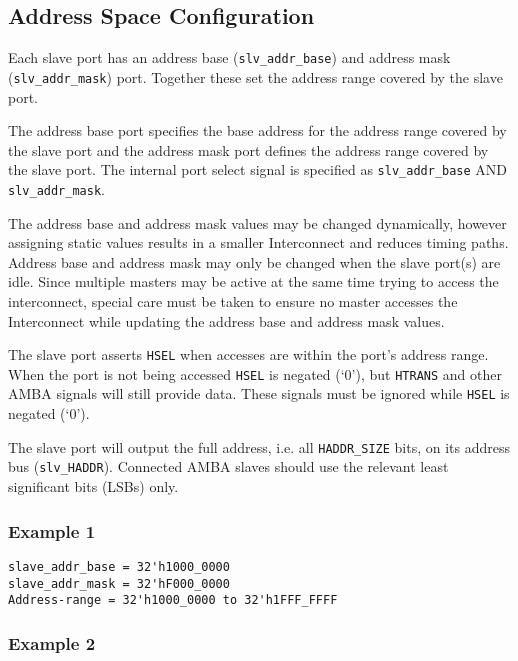 \subsection{Address Space
Configuration}\label{address-space-configuration}

Each slave port has an address base (\texttt{slv\_addr\_base}) and address mask
(\texttt{slv\_addr\_mask}) port. Together these set the address range covered by
the slave port.

The address base port specifies the base address for the address range
covered by the slave port and the address mask port defines the address
range covered by the slave port. The internal port select signal is
specified as \texttt{slv\_addr\_base} AND \texttt{slv\_addr\_mask}.

The address base and address mask values may be changed dynamically,
however assigning static values results in a smaller Interconnect and
reduces timing paths. Address base and address mask may only be changed
when the slave port(s) are idle. Since multiple masters may be active at
the same time trying to access the interconnect, special care must be
taken to ensure no master accesses the Interconnect while updating the
address base and address mask values.

The slave port asserts \texttt{HSEL} when accesses are within the port's address
range. When the port is not being accessed \texttt{HSEL} is negated (`0'), but
\texttt{HTRANS} and other AMBA signals will still provide data. These signals
must be ignored while \texttt{HSEL} is negated (`0').

The slave port will output the full address, i.e. all \texttt{HADDR\_SIZE} bits,
on its address bus (\texttt{slv\_HADDR}). Connected AMBA slaves should use the
relevant least significant bits (LSBs) only.

\pagebreak

\subsubsection{Example 1}\label{example-1}

\begin{verbatim}
slave_addr_base = 32'h1000_0000
slave_addr_mask = 32'hF000_0000
Address-range = 32'h1000_0000 to 32'h1FFF_FFFF
\end{verbatim}

\subsubsection{Example 2}\label{example-2}

